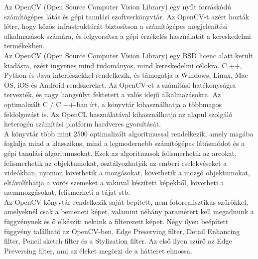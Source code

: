 

Az OpenCV (Open Source Computer Vision Library) egy nyílt forráskódú számítógépes látás és gépi tanulási szoftverkönyvtár. Az OpenCV-t azért hozták létre, hogy közös infrastruktúrát biztosítson a számítógépes megjelenítési alkalmazások számára, és felgyorsítsa a gépi érzékelés használatát a kereskedelmi termékekben. 
\\

\noindent Az OpenCV (Open Source Computer Vision Library) egy BSD licenc alatt került kiadásra, ezért ingyenes mind tudományos, mind kereskedelmi célokra. C ++, Python és Java interfészekkel rendelkezik, és támogatja a Windows, Linux, Mac OS, iOS és Android rendszereket. Az OpenCV-et a számítási hatékonyságra tervezték, és nagy hangsúlyt fektetett a valós idejű alkalmazásokra. Az optimalizált C / C ++-ban írt, a könyvtár kihasználhatja a többmagos feldolgozást is. Az OpenCL használatával kihasználhatja az alapul szolgáló heterogén számítási platform hardveres gyorsítását.
\\

\noindent A könyvtár több mint 2500 optimalizált algoritmussal rendelkezik, amely magába foglalja mind a klasszikus, mind a legmodernebb számítógépes látásmódot és a gépi tanulási algoritmusokat. Ezek az algoritmusok felismerhetik az arcokat, felismerhetik az objektumokat, osztályozhatják az emberi cselekvéseket a videókban, nyomon követhetik a mozgásokat, követhetik a mozgó objektumokat, eltávolíthatja a vörös szemeket a vakuval készített képekből, követheti a szemmozgásokat, felismerheti a tájat stb. 
\\
Az OpenCV könyvtár rendelkezik saját bepített, nem fotorealisztikus szűrőkkel, amelyeknél csak a bemeneti képet, valamint néhány paramétert kell megadnunk a függvénynek és ő elkészíti nekünk a filterezett képet. Négy ilyen beépített függvény található az OpenCV-ben, Edge Preserving filter, Detail Enhancing filter, Pencil sketch filter és a Stylization filter.
Az első ilyen szűrő az Edge Preversing filter, ami az éleket megörzi de a hátteret elmossa. 






